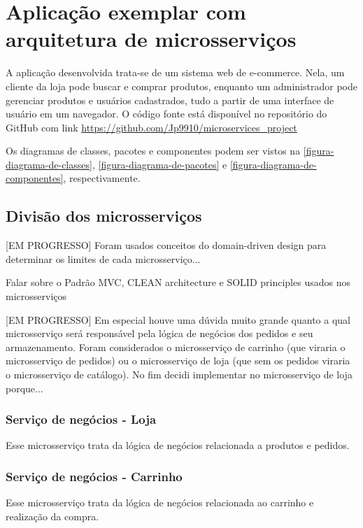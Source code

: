 \chapter{Aplicação exemplar com arquitetura de microsserviços}\label{chapter-aplicacao}



A aplicação desenvolvida trata-se de um sistema web de e-commerce. Nela, um cliente da loja pode buscar e comprar produtos, enquanto um administrador pode gerenciar produtos e usuários cadastrados, tudo a partir de uma interface de usuário em um navegador.
O código fonte está disponível no repositório do GitHub com link \url{https://github.com/Jp9910/microservices_project}

Os diagramas de classes, pacotes e componentes podem ser vistos na \autoref{figura-diagrama-de-classes}, \autoref{figura-diagrama-de-pacotes} e \autoref{figura-diagrama-de-componentes}, respectivamente.

\section{Divisão dos microsserviços}
[EM PROGRESSO] Foram usados conceitos do domain-driven design para determinar os limites de cada microsserviço...

Falar sobre o Padrão MVC, CLEAN architecture e SOLID principles usados nos microsserviços

[EM PROGRESSO] Em especial houve uma dúvida muito grande quanto a qual microsserviço será responsável pela lógica de negócios dos pedidos e seu armazenamento. Foram considerados o microsserviço de carrinho (que viraria o microsserviço de pedidos) ou o microsserviço de loja (que sem os pedidos viraria o microsserviço de catálogo). No fim decidi implementar no microsserviço de loja porque...

\subsection*{Serviço de negócios - Loja}
Esse microsserviço trata da lógica de negócios relacionada a produtos e pedidos.

\subsection*{Serviço de negócios - Carrinho}
Esse microsserviço trata da lógica de negócios relacionada ao carrinho e realização da compra.

